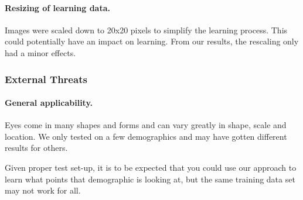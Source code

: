 \paragraph{Resizing of learning data.}
Images were scaled down to 20x20 pixels to simplify the learning process.
This could potentially have an impact on learning.
From our results, the rescaling only had a minor effects.

\subsubsection{External Threats}
\paragraph{General applicability.}
Eyes come in many shapes and forms and can vary greatly in shape, scale and location.
We only tested on a few demographics and may have gotten different results for others.

Given proper test set-up, it is to be expected that you could use our approach to learn what points that demographic is looking at, but the same training data set may not work for all.